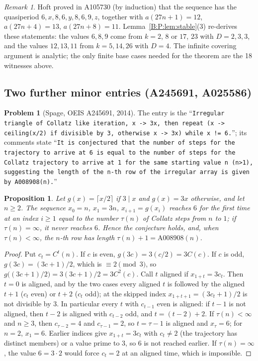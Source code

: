 \documentclass[11pt,a4paper]{article}
\newtheorem{proposition}[theorem]{Proposition}
\theoremstyle{definition}
\newtheorem{problem}[theorem]{Problem}
\theoremstyle{remark}
\newtheorem{remark}[theorem]{Remark}
\numberwithin{equation}{section}
\begin{document}
\begin{remark}
Hoft proved in A105730 (by induction) that the sequence has the quasiperiod
$6,x,8,6,y,8,6,9,z$, together with $a(27n+1)=12$, $a(27n+4)=13$, $a(27n+8)=11$.
Lemma~\ref{B:P:lem:stable}(3) re-derives these statements: the values $6,8,9$ come
from $k=2$, $8$ or $17$, $23$ with $D=2,3,3$, and the values $12,13,11$ from $k=5,14,26$
with $D=4$. The infinite covering argument is analytic; the only finite base cases
needed for the theorem are the 18 witnesses above.
\end{remark}

\subsection{Two further minor entries (A245691, A025586)}

\begin{problem}[Spage, OEIS A245691, 2014]\label{B:P:prob:A245691}
The entry \cite{R053} is the ``\texttt{Irregular triangle of Collatz like
iteration, x -> 3x, then repeat (x -> ceiling(x/2) if divisible by 3, otherwise x
-> 3x) while x != 6.}''; its comments state ``\texttt{It is conjectured that the
number of steps for the trajectory to arrive at 6 is equal to the number of steps
for the Collatz trajectory to arrive at 1 for the same starting value n (n>1),
suggesting the length of the n-th row of the irregular array is given by
A008908(n).}''
\end{problem}

\begin{proposition}\label{B:P:prop:A245691}
Let $g(x)=\lceil x/2\rceil$ if $3\mid x$ and $g(x)=3x$ otherwise, and let
$n\ge2$. The sequence $x_0=n$, $x_1=3n$, $x_{i+1}=g(x_i)$ reaches $6$ for the
first time at an index $i\ge1$ equal to the number $\tau(n)$ of Collatz steps from $n$
to $1$; if $\tau(n)=\infty$, it never reaches $6$. Hence the conjecture holds,
and, when $\tau(n)<\infty$, the $n$-th row has length $\tau(n)+1=\mathrm{A008908}(n)$.
\end{proposition}

\begin{proof}
Put $c_t=C^t(n)$. If $c$ is even, $g(3c)=3(c/2)=3C(c)$. If $c$ is odd,
$g(3c)=(3c+1)/2$, which is $\equiv2\pmod3$, so $g\bigl((3c+1)/2\bigr)=3(3c+1)/2=3C^2(c)$.
Call $t$ aligned if $x_{1+t}=3c_t$. Then $t=0$ is aligned, and by the two cases
every aligned $t$ is followed by the aligned $t+1$ ($c_t$ even) or $t+2$ ($c_t$
odd); at the skipped index $x_{1+t+1}=(3c_t+1)/2$ is not divisible by $3$. In
particular every $t$ with $c_{t-1}$ even is aligned: if $t-1$ is not aligned,
then $t-2$ is aligned with $c_{t-2}$ odd, and $t=(t-2)+2$. If $\tau(n)<\infty$ and
$n\ge3$, then $c_{\tau-2}=4$ and $c_{\tau-1}=2$, so $t=\tau-1$ is aligned and
$x_\tau=6$; for $n=2$, $x_1=6$. Earlier indices give $x_{1+t}=3c_t$ with
$c_t\ne2$ (the trajectory has distinct members) or a value prime to $3$, so $6$
is not reached earlier. If $\tau(n)=\infty$, the value $6=3\cdot2$ would force
$c_t=2$ at an aligned time, which is impossible.
\end{proof}
\end{document}
